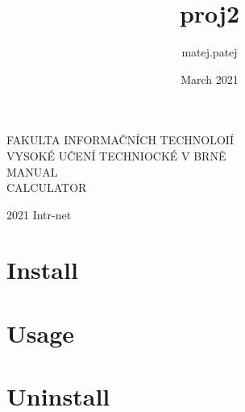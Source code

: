 \documentclass[11pt, a4paper, twocolumn ]{article}
\title{proj2}
\author{matej.patej }
\date{March 2021}
\theoremstyle{definition}
\begin{document}
    \begin{titlepage}
        \begin{center}
            \vspace*{1cm}

            \huge
            \Huge F\huge AKULTA INFORMAČNÍCH TECHNOLOIÍ\\
            \hspace{0.2cm}
            \Huge V\huge YSOKÉ UČENÍ TECHNIOCKÉ V \Huge B\huge RNĚ\\
            MANUAL\\
            CALCULATOR


        \end{center}
        {\LARGE 2021 \hfill
        Intr-net}
    \end{titlepage}

    \newpage

    \section{Install}


    \section{Usage}

    
    \section{Uninstall}
\end{document}
